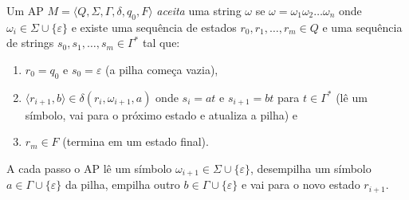 Um AP $M = \langle Q, \Sigma, \Gamma, \delta, q_0, F \rangle$ {\em aceita} uma string $\omega$ se $\omega = \omega_1 \omega_2 \dots \omega_n$ onde $\omega_i \in \Sigma \cup \{\varepsilon\}$ e existe uma sequência de estados $r_0, r_1, \dots, r_m \in Q$ e uma sequência de strings $s_0, s_1, \dots, s_m \in \Gamma^*$ tal que:
\begin{enumerate}
\item $r_0 = q_0$ e $s_0 = \varepsilon$ (a pilha começa vazia),
\item $\langle r_{i+1}, b \rangle \in \delta(r_i, \omega_{i+1}, a)$ onde $s_i = at$ e $s_{i+1} = bt$ para $t \in \Gamma^*$ (lê um símbolo, vai para o próximo estado e atualiza a pilha) e
\item $r_m \in F$ (termina em um estado final).
\end{enumerate}

A cada passo o AP lê um símbolo $\omega_{i+1} \in \Sigma \cup \{\varepsilon\}$, desempilha um símbolo $a \in \Gamma \cup \{\varepsilon\}$ da pilha, empilha outro $b \in \Gamma \cup \{\varepsilon\}$ e vai para o novo estado $r_{i+1}$.


